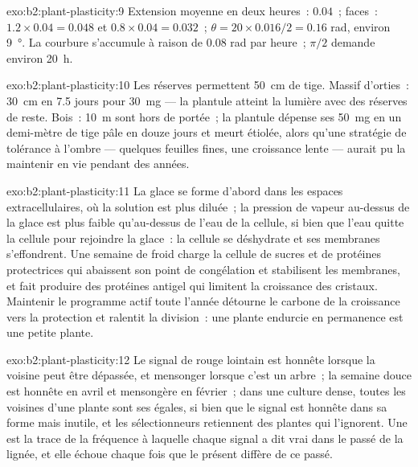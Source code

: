 \begin{solution}{exo:b2:plant-plasticity:9}
Extension moyenne en deux heures~: $0.04$~; faces~:
$1.2\times 0.04 = 0.048$ et $0.8\times 0.04 = 0.032$~; $\theta = 20\times 0.016/2 = 0.16$
rad, environ \qty{9}{\degree}. La courbure s'accumule à raison de $0.08$
rad par heure~; $\pi/2$ demande environ \qty{20}{h}.
\end{solution}

\begin{solution}{exo:b2:plant-plasticity:10}
Les réserves permettent \qty{50}{cm} de tige. Massif d'orties~:
\qty{30}{cm} en 7.5 jours pour \qty{30}{mg} --- la plantule atteint la
lumière avec des réserves de reste. Bois~: \qty{10}{m} sont hors de
portée~; la plantule dépense ses \qty{50}{mg} en un demi-mètre de tige
pâle en douze jours et meurt étiolée, alors qu'une stratégie de
tolérance à l'ombre --- quelques feuilles fines, une croissance lente ---
aurait pu la maintenir en vie pendant des années.
\end{solution}

\begin{solution}{exo:b2:plant-plasticity:11}
La glace se forme d'abord dans les espaces extracellulaires, où la
solution est plus diluée~; la pression de vapeur au-dessus de la glace
est plus faible qu'au-dessus de l'eau de la cellule, si bien que l'eau
quitte la cellule pour rejoindre la glace~: la cellule se déshydrate et
ses membranes s'effondrent. Une semaine de froid charge la cellule de
sucres et de protéines protectrices qui abaissent son point de
congélation et stabilisent les membranes, et fait produire des
protéines antigel qui limitent la croissance des cristaux. Maintenir le
programme actif toute l'année détourne le carbone de la croissance vers
la protection et ralentit la division~: une plante endurcie en
permanence est une petite plante.
\end{solution}

\begin{solution}{exo:b2:plant-plasticity:12}
Le signal de rouge lointain est honnête lorsque la voisine peut être
dépassée, et mensonger lorsque c'est un arbre~; la semaine douce est
honnête en avril et mensongère en février~; dans une culture dense,
toutes les voisines d'une plante sont ses égales, si bien que le signal
est honnête dans sa forme mais inutile, et les sélectionneurs retiennent
des plantes qui l'ignorent. Une  est la trace de la
fréquence à laquelle chaque signal a dit vrai dans le passé de la
lignée, et elle échoue chaque fois que le présent diffère de ce passé.
\end{solution}

